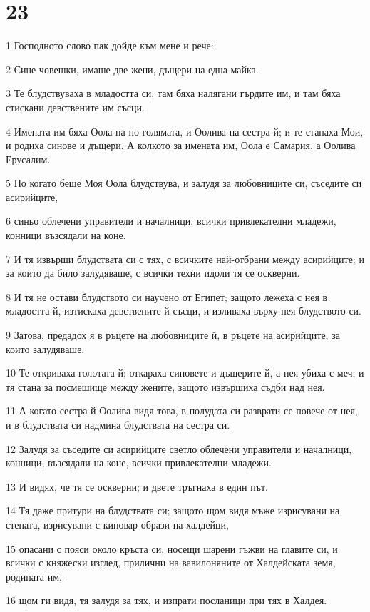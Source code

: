 \chapter{23}

\par 1 Господното слово пак дойде към мене и рече:
\par 2 Сине човешки, имаше две жени, дъщери на една майка.
\par 3 Те блудствуваха в младостта си; там бяха налягани гърдите им, и там бяха стискани девствените им съсци.
\par 4 Имената им бяха Оола на по-голямата, и Оолива на сестра й; и те станаха Мои, и родиха синове и дъщери. А колкото за имената им, Оола е Самария, а Оолива Ерусалим.
\par 5 Но когато беше Моя Оола блудствува, и залудя за любовниците си, съседите си асирийците,
\par 6 синьо облечени управители и началници, всички привлекателни младежи, конници възсядали на коне.
\par 7 И тя извърши блудствата си с тях, с всичките най-отбрани между асирийците; и за които да било залудяваше, с всички техни идоли тя се оскверни.
\par 8 И тя не остави блудството си научено от Египет; защото лежеха с нея в младостта й, изтискаха девствените й съсци, и изливаха върху нея блудството си.
\par 9 Затова, предадох я в ръцете на любовниците й, в ръцете на асирийците, за които залудяваше.
\par 10 Те откриваха голотата й; откараха синовете и дъщерите й, а нея убиха с меч; и тя стана за посмешище между жените, защото извършиха съдби над нея.
\par 11 А когато сестра й Оолива видя това, в полудата си разврати се повече от нея, и в блудствата си надмина блудствата на сестра си.
\par 12 Залудя за съседите си асирийците светло облечени управители и началници, конници, възсядали на коне, всички привлекателни младежи.
\par 13 И видях, че тя се оскверни; и двете тръгнаха в един път.
\par 14 Тя даже притури на блудствата си; защото щом видя мъже изрисувани на стената, изрисувани с киновар образи на халдейци,
\par 15 опасани с пояси около кръста си, носещи шарени гъжви на главите си, и всички с княжески изглед, прилични на вавилоняните от Халдейската земя, родината им, -
\par 16 щом ги видя, тя залудя за тях, и изпрати посланици при тях в Халдея.
